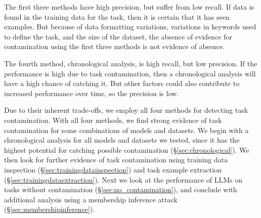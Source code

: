 \documentclass[letterpaper]{article} %
\begin{document}
The first three methods have high precision, but suffer from low recall.  If data is found in the training data for the task, then it is certain that it has seen examples.  But because of data formatting variations, variations in keywords used to define the task, and the size of the dataset, the absence of evidence for contamination using the first three methods is not evidence of absence.

The fourth method, chronological analysis, is high recall, but low precision.  If the performance is high due to task contamination, then a chronological analysis will have a high chance of catching it.  But other factors could also contribute to increased performance over time, so the precision is low.

Due to their inherent trade-offs, we employ all four methods for detecting task contamination.  With all four methods, we find strong evidence of task contamination for some combinations of models and datasets.  We begin with a chronological analysis for all models and datasets we tested, since it has the highest potential for catching possible contamination (\S\ref{sec:chronological}).  We then look for further evidence of task contamination using training data inspection (\S\ref{sec:trainingdatainspection}) and task example extraction (\S\ref{sec:trainingdataextraction}). Next we look at the performance of LLMs on tasks without contamination (\S\ref{sec:no_contamination}), and conclude with additional analysis using a membership inference attack (\S\ref{sec:membershipinference}).

\end{document}

